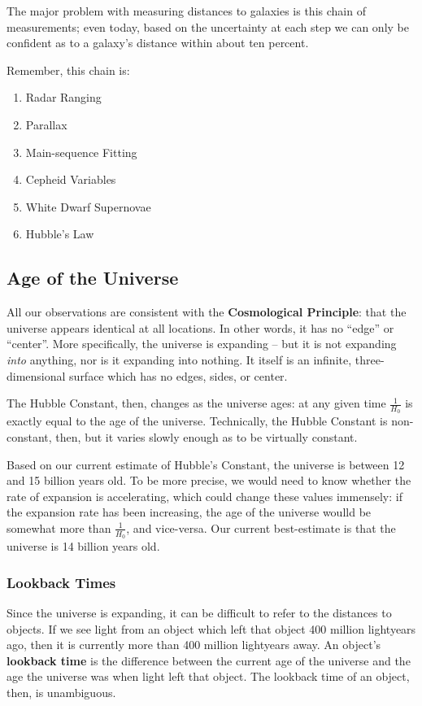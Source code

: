 The major problem with measuring distances to galaxies is this chain of measurements; even today, based on the uncertainty at each step we can only be confident as to a galaxy's distance within about ten percent.

Remember, this chain is:
\begin{enumerate}
\item Radar Ranging
\item Parallax
\item Main-sequence Fitting
\item Cepheid Variables
\item White Dwarf Supernovae
\item Hubble's Law
\end{enumerate}

\subsection{Age of the Universe}
All our observations are consistent with the {\bf Cosmological Principle}: that the universe appears identical at all locations. In other words, it has no ``edge'' or ``center''. More specifically, the universe is expanding -- but it is not expanding \emph{into} anything, nor is it expanding into nothing. It itself is an infinite, three-dimensional surface which has no edges, sides, or center.

The Hubble Constant, then, changes as the universe ages: at any given time $\frac{1}{H_0}$ is exactly equal to the age of the universe. Technically, the Hubble Constant is non-constant, then, but it varies slowly enough as to be virtually constant.

Based on our current estimate of Hubble's Constant, the universe is between 12 and 15 billion years old. To be more precise, we would need to know whether the rate of expansion is accelerating, which could change these values immensely: if the expansion rate has been increasing, the age of the universe woulld be somewhat more than $\frac{1}{H_0}$, and vice-versa. Our current best-estimate is that the universe is 14 billion years old.

\subsubsection{Lookback Times}
Since the universe is expanding, it can be difficult to refer to the distances to objects. If we see light from an object which left that object 400 million lightyears ago, then it is currently more than 400 million lightyears away. An object's {\bf lookback time} is the difference between the current age of the universe and the age the universe was when light left that object. The lookback time of an object, then, is unambiguous.

